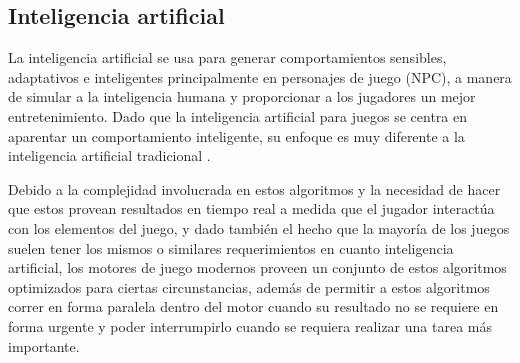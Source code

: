 \subsection{Inteligencia artificial}

La inteligencia artificial se usa para generar comportamientos sensibles, adaptativos e inteligentes principalmente en personajes de juego (NPC), a manera de simular a la inteligencia humana y proporcionar a los jugadores un mejor entretenimiento. Dado que la inteligencia artificial para juegos se centra en aparentar un comportamiento inteligente, su enfoque es muy diferente a la inteligencia artificial tradicional \cite{millington2016artificial}.

Debido a la complejidad involucrada en estos algoritmos y la necesidad de hacer que estos provean resultados en tiempo real a medida que el jugador interactúa con los elementos del juego, y dado también el hecho que la mayoría de los juegos suelen tener los mismos o similares requerimientos en cuanto inteligencia artificial, los motores de juego modernos proveen un conjunto de estos algoritmos optimizados para ciertas circunstancias, además de permitir a estos algoritmos correr en forma paralela dentro del motor cuando su resultado no se requiere en forma urgente y poder interrumpirlo cuando se requiera realizar una tarea más importante.
